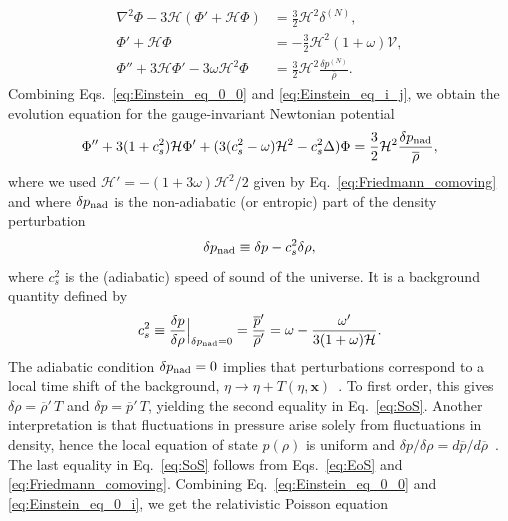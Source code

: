 \documentclass[twocolumn,superscriptaddress,aps,preprintnumbers,amsmath,amssymb,prl,footinbib]{revtex4-2}
\begin{document}
\begin{align}
    \nabla^2\Phi - 3\mathcal{H}(\Phi' + \mathcal{H}\Phi) &= \frac{3}{2}\mathcal{H}^2\delta^{(N)},\label{eq:Einstein_eq_0_0}\\
    \Phi' + \mathcal{H}\Phi &= -\frac{3}{2}\mathcal{H}^2 (1+\omega)\mathcal{V},\label{eq:Einstein_eq_0_i}\\
    \Phi'' + 3\mathcal{H}\Phi' -3\omega\mathcal{H}^2\Phi &= \frac{3}{2}\mathcal{H}^2\frac{\delta p^{(N)}}{\overline{\rho}}.\label{eq:Einstein_eq_i_j}
\end{align}
 Combining Eqs.~\eqref{eq:Einstein_eq_0_0} and \eqref{eq:Einstein_eq_i_j}, we obtain the evolution equation for the gauge-invariant Newtonian potential
\begin{equation}
\label{eq:Newtonian_potential_evolution_app}
\Phi'' + 3 (1 + c_s^2)\mathcal{H} \Phi' + (3 (c_s^2-\omega)\mathcal{H}^2-c_s^2 \Delta)\Phi =\frac{3}{2}\mathcal{H}^2 \frac{\delta p_{\rm nad}}{\overline{\rho}},
\end{equation}
where we used $\mathcal{H}' = -(1 + 3\omega)\mathcal{H}^2/2$ given by Eq.~\eqref{eq:Friedmann_comoving} and where $\delta p_{\rm nad}$ is the non-adiabatic (or entropic) part of the density perturbation
\begin{equation}
\label{eq:delta_nad_app_def}
    \delta p_{\rm nad}\equiv \delta p-c_s^2\delta \rho,
\end{equation}
where $c_s^2$ is the (adiabatic) speed of sound of the universe. It is a background quantity defined by
\begin{equation}
\label{eq:SoS}
c_s^2 \equiv \frac{\delta p}{\delta \rho}\Big|_{\delta p_{\rm nad}=0} = \frac{\overline{p}'}{\overline{\rho}'} = \omega -\frac{\omega'}{3(1+\omega)\mathcal{H}}.
\end{equation}
The adiabatic condition $\delta p_{\rm nad}=0$ implies that perturbations correspond to a local time shift of the background, $\eta\to\eta+T(\eta,\mathbf{x})$~\cite{Baumann:2022mni}. To first order, this gives $\delta\rho=\overline{\rho}'\,T$ and $\delta p=\overline{p}'\,T$, yielding the second equality in Eq.~\eqref{eq:SoS}. Another interpretation is that fluctuations in pressure arise solely from fluctuations in density, hence the local equation of state $p(\rho)$ is uniform and $\delta p/\delta \rho = d\overline{p}/d\overline{\rho}$~\cite{Bardeen:1983qw}. The last equality in Eq.~\eqref{eq:SoS} follows from Eqs.~\eqref{eq:EoS} and \eqref{eq:Friedmann_comoving}.
Combining Eq.~\eqref{eq:Einstein_eq_0_0} and \eqref{eq:Einstein_eq_0_i}, we get the relativistic Poisson equation
\end{document}
